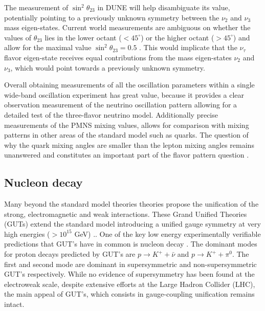 The measurement of $\sin^2\theta_{23}$ in DUNE will help disambiguate its value, potentially pointing to a previously unknown symmetry between the $\nu_2$ and $\nu_3$ mass eigen-states.  Current world measurements are ambiguous on whether the values of $\theta_\text{23}$ lies in the lower octant ($<45^\circ$) or the higher octant ($>45^\circ$) and allow for the maximal value $\sin^2\theta_{23}=0.5$ \cite{Esteban:2018azc}. This would implicate that the $\nu_\tau$ flavor eigen-state receives equal contributions from the mass eigen-states $\nu_2$ and $\nu_3$, which would point towards a previously unknown symmetry. 

Overall obtaining measurements of all the oscillation parameters within a single wide-band oscillation experiment has great value, because it provides a clear observation measurement of the neutrino oscillation pattern allowing for a detailed test of the three-flavor neutrino model. Additionally precise measurements of the PMNS mixing values, allows for comparison with mixing patterns in other areas of the standard model such as quarks. The question of why the quark mixing angles are smaller than the lepton mixing angles remains unanswered and constitutes an important part of the flavor pattern question \cite{King:2014nza}. 


\subsection{Nucleon decay}
\label{Sec:ProtonDecay}
Many beyond the standard model theories theories propose the unification  of the strong, electromagnetic and weak interactions. These Grand Unified Theories (GUTs) extend the standard model introducing a unified gauge symmetry at very high energies ($>10^{15}$ GeV) \cite{deBoer:1994dg}.. One of the key low energy experimentally verifiable predictions that GUT's have in common is nucleon decay \cite{Langacker:1980js}. The dominant modes for proton decays predicted by GUT's are $p\rightarrow K^+ + \bar{\nu}$ and $p\rightarrow K^+ +\pi^0$. The first and second mode are dominant in supersymmetric and non-supersymmetric GUT's respectively. While no evidence of supersymmetry has been found at the electroweak scale, despite extensive efforts at the Large Hadron Collider (LHC), the main appeal of GUT's, which consists in gauge-coupling unification remains intact. 

